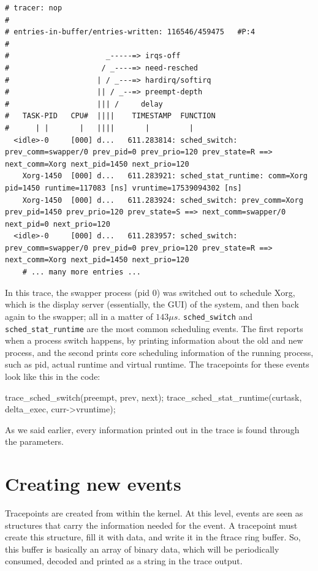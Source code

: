\begin{Verbatim}[xleftmargin=-4cm,fontsize=\scriptsize]
# tracer: nop
#
# entries-in-buffer/entries-written: 116546/459475   #P:4
#
#                      _-----=> irqs-off
#                     / _----=> need-resched
#                    | / _---=> hardirq/softirq
#                    || / _--=> preempt-depth
#                    ||| /     delay
#   TASK-PID   CPU#  ||||    TIMESTAMP  FUNCTION
#      | |       |   ||||       |         |
  <idle>-0     [000] d...   611.283814: sched_switch: prev_comm=swapper/0 prev_pid=0 prev_prio=120 prev_state=R ==> next_comm=Xorg next_pid=1450 next_prio=120
    Xorg-1450  [000] d...   611.283921: sched_stat_runtime: comm=Xorg pid=1450 runtime=117083 [ns] vruntime=17539094302 [ns]
    Xorg-1450  [000] d...   611.283924: sched_switch: prev_comm=Xorg prev_pid=1450 prev_prio=120 prev_state=S ==> next_comm=swapper/0 next_pid=0 next_prio=120
  <idle>-0     [000] d...   611.283957: sched_switch: prev_comm=swapper/0 prev_pid=0 prev_prio=120 prev_state=R ==> next_comm=Xorg next_pid=1450 next_prio=120
    # ... many more entries ...
\end{Verbatim}
In this trace, the swapper process (pid 0) was switched out to schedule Xorg, which is the display server (essentially, the GUI) of the system, and then back again to the swapper; all in a matter of $143 \mu s$. \verb|sched_switch| and \verb|sched_stat_runtime| are the most common scheduling events. The first reports when a process switch happens, by printing information about the old and new process, and the second prints core scheduling information of the running process, such as pid, actual runtime and virtual runtime. The tracepoints for these events look like this in the code:
\begin{code}
trace_sched_switch(preempt, prev, next);
trace_sched_stat_runtime(curtask, delta_exec, curr->vruntime);
\end{code}
As we said earlier, every information printed out in the trace is found through the parameters.

\section{Creating new events}

Tracepoints are created from within the kernel. At this level, events are seen as structures that carry the information needed for the event. A tracepoint must create this structure, fill it with data, and write it in the ftrace ring buffer. So, this buffer is basically an array of binary data, which will be periodically consumed, decoded and printed as a string in the trace output.


